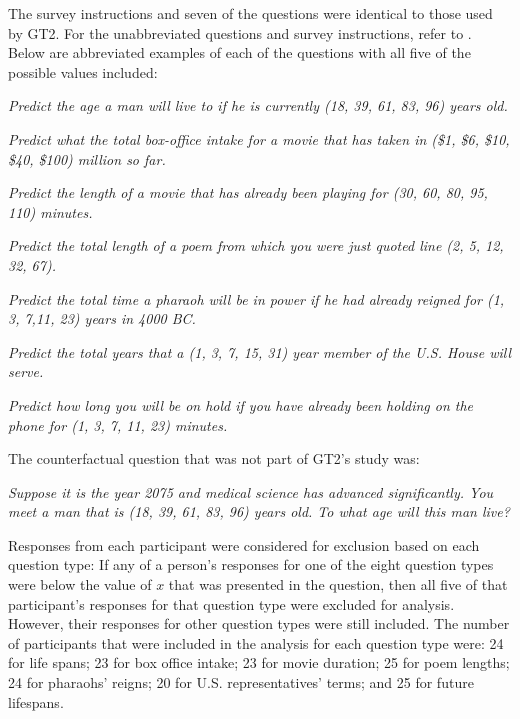 The survey instructions and seven of the questions were identical to those used by GT2. For the unabbreviated questions and survey instructions, refer to . Below are abbreviated examples of each of the questions with all five of the possible values included:
\begin{description}[noitemsep]\setlength{\itemindent}{-.2cm}
\item[Lifespans:] {\it Predict the age a man will live to if he is currently (18, 39, 61, 83, 96) years old.}
\item[Movie grosses:] {\it Predict what the total box-office intake for a movie that has taken in (\$1, \$6, \$10, \$40, \$100) million so far.}
\item[Movie runtimes:] {\it Predict the length of a movie that has already been playing for (30, 60, 80, 95, 110) minutes.}
\item[Poem lengths:] {\it Predict the total length of a poem from which you were just quoted line (2, 5, 12, 32, 67).}
\item[Pharaohs' reigns:] {\it Predict the total time a pharaoh will be in power if he had already reigned for (1, 3, 7,11, 23) years in 4000 BC.}
\item[Representatives' terms:] {\it Predict the total years that a (1, 3, 7, 15, 31) year member of the U.S. House will serve.}
\item[Waiting times:] {\it Predict how long you will be on hold if you have already been holding on the phone for (1, 3, 7, 11, 23) minutes.}
\end{description}
The counterfactual question that was not part of GT2's study was:
\begin{description}\setlength{\itemindent}{-.2cm}
\item[Future lifespans:] {\it Suppose it is the year 2075 and medical science has advanced significantly. You meet a man that is (18, 39, 61, 83, 96) years old. To what age will this man live?}
\end{description}
Responses from each participant were considered for exclusion based on each question type: If any of a person's responses for one of the eight question types were below the value of $x$ that was presented in the question, then all five of that participant's responses for that question type were excluded for analysis. However, their responses for other question types were still included. %
The number of participants that were included in the analysis for each question type were: 24 for life spans; 23 for box office intake; 23 for movie duration; 25 for poem lengths; 24 for pharaohs' reigns; 20 for U.S. representatives' terms; and 25 for future lifespans.



